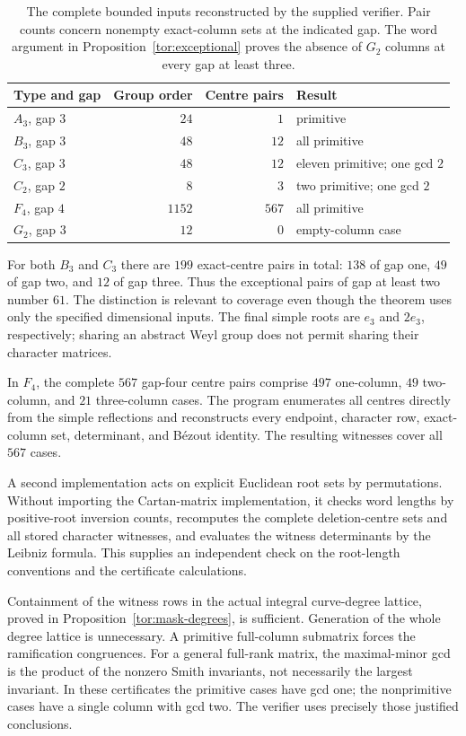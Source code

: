 \begin{table}[htbp]
\centering
\small
\begin{tabular}{lrrl}
\toprule
Type and gap & Group order & Centre pairs & Result\\
\midrule
$A_3$, gap $3$ & $24$ & $1$ & primitive\\
$B_3$, gap $3$ & $48$ & $12$ & all primitive\\
$C_3$, gap $3$ & $48$ & $12$ & eleven primitive; one gcd $2$\\
$C_2$, gap $2$ & $8$ & $3$ & two primitive; one gcd $2$\\
$F_4$, gap $4$ & $1152$ & $567$ & all primitive\\
$G_2$, gap $3$ & $12$ & $0$ & empty-column case\\
\bottomrule
\end{tabular}
\caption{The complete bounded inputs reconstructed by the supplied verifier. Pair counts concern nonempty exact-column sets at the indicated gap. The word argument in Proposition~\ref{tor:exceptional} proves the absence of $G_2$ columns at every gap at least three.}
\label{tab:certificate-summary}
\end{table}

For both $B_3$ and $C_3$ there are $199$ exact-centre pairs in total: $138$ of gap one, $49$ of gap two, and $12$ of gap three. Thus the exceptional pairs of gap at least two number $61$. The distinction is relevant to coverage even though the theorem uses only the specified dimensional inputs. The final simple roots are $e_3$ and $2e_3$, respectively; sharing an abstract Weyl group does not permit sharing their character matrices.

In $F_4$, the complete $567$ gap-four centre pairs comprise $497$ one-column, $49$ two-column, and $21$ three-column cases. The program enumerates all centres directly from the simple reflections and reconstructs every endpoint, character row, exact-column set, determinant, and B\'ezout identity. The resulting witnesses cover all $567$ cases.

A second implementation acts on explicit Euclidean root sets by permutations. Without importing the Cartan-matrix implementation, it checks word lengths by positive-root inversion counts, recomputes the complete deletion-centre sets and all stored character witnesses, and evaluates the witness determinants by the Leibniz formula. This supplies an independent check on the root-length conventions and the certificate calculations.

Containment of the witness rows in the actual integral curve-degree lattice, proved in Proposition~\ref{tor:mask-degrees}, is sufficient. Generation of the whole degree lattice is unnecessary. A primitive full-column submatrix forces the ramification congruences. For a general full-rank matrix, the maximal-minor gcd is the product of the nonzero Smith invariants, not necessarily the largest invariant. In these certificates the primitive cases have gcd one; the nonprimitive cases have a single column with gcd two. The verifier uses precisely those justified conclusions.

